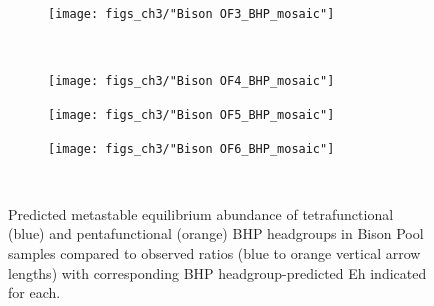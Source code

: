 \begin{figure}[h]\ContinuedFloat
    \begin{subfigure}[b]{\linewidth}
        \texttt{[image: figs\_ch3/"Bison OF3\_BHP\_mosaic"]}
        \label{fig:BP3_degform}
    \end{subfigure}\\[-4ex]
    \begin{subfigure}[b]{\linewidth}
    	\texttt{[image: figs\_ch3/"Bison OF4\_BHP\_mosaic"]}
        \label{fig:BP4_degform}
    \end{subfigure}
\end{figure}

\newpage

\begin{figure}[h]\ContinuedFloat
    \begin{subfigure}[b]{\linewidth}
        \texttt{[image: figs\_ch3/"Bison OF5\_BHP\_mosaic"]}
        \label{fig:BP5_degform}
    \end{subfigure}
    \begin{subfigure}[b]{\linewidth}
        \texttt{[image: figs\_ch3/"Bison OF6\_BHP\_mosaic"]}
        \label{fig:BP6_degform}
    \end{subfigure}\\[-4ex]

\caption[Predicted metastable equilibrium abundance of tetrafunctional and pentafunctional BHP headgroups in Bison Pool]{Predicted metastable equilibrium abundance of tetrafunctional (blue) and pentafunctional (orange) BHP headgroups in Bison Pool samples compared to observed ratios (blue to orange vertical arrow lengths) with corresponding BHP headgroup-predicted Eh indicated for each.}
\label{fig:BHP_degree_formation_bison}
\end{figure}
\doublespace




